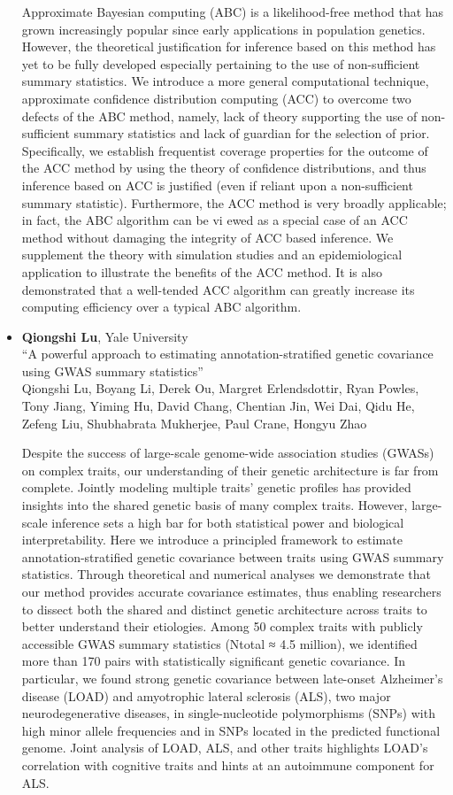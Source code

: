 \begin{itemize}
Approximate Bayesian computing (ABC) is a likelihood-free method that has grown increasingly popular since early applications in population genetics. However, the theoretical justification for inference based on this method has yet to be fully developed especially pertaining to the use of non-sufficient summary statistics. We introduce a more general computational technique, approximate confidence distribution computing (ACC) to overcome two defects of the ABC method, namely, lack of theory supporting the use of non-sufficient summary statistics and lack of guardian for the selection of prior. Specifically, we establish frequentist coverage properties for the outcome of the ACC method by using the theory of confidence distributions, and thus inference based on ACC is justified (even if reliant upon a non-sufficient summary statistic). Furthermore, the ACC method is very broadly applicable; in fact, the ABC algorithm can be vi ewed as a special case of an ACC method without damaging the integrity of ACC based inference. We supplement the theory with simulation studies and an epidemiological application to illustrate the benefits of the ACC method. It is also demonstrated that a well-tended ACC algorithm can greatly increase its computing efficiency over a typical ABC algorithm.

\item \textbf{Qiongshi Lu}, Yale University \\
``A powerful approach to estimating annotation-stratified genetic covariance using GWAS summary statistics'' \\
Qiongshi Lu, Boyang Li, Derek Ou, Margret Erlendsdottir, Ryan Powles, Tony Jiang, Yiming Hu, David Chang, Chentian Jin, Wei Dai, Qidu He, Zefeng Liu, Shubhabrata Mukherjee, Paul Crane, Hongyu Zhao


Despite the success of large-scale genome-wide association studies (GWASs) on complex traits, our understanding of their genetic architecture is far from complete. Jointly modeling multiple traits’ genetic profiles has provided insights into the shared genetic basis of many complex traits. However, large-scale inference sets a high bar for both statistical power and biological interpretability. Here we introduce a principled framework to estimate annotation-stratified genetic covariance between traits using GWAS summary statistics. Through theoretical and numerical analyses we demonstrate that our method provides accurate covariance estimates, thus enabling researchers to dissect both the shared and distinct genetic architecture across traits to better understand their etiologies. Among 50 complex traits with publicly accessible GWAS summary statistics (Ntotal ≈ 4.5 million), we identified more than 170 pairs with statistically significant genetic covariance. In particular, we found strong genetic covariance between late-onset Alzheimer’s disease (LOAD) and amyotrophic lateral sclerosis (ALS), two major neurodegenerative diseases, in single-nucleotide polymorphisms (SNPs) with high minor allele frequencies and in SNPs located in the predicted functional genome. Joint analysis of LOAD, ALS, and other traits highlights LOAD’s correlation with cognitive traits and hints at an autoimmune component for ALS.


\end{itemize}
